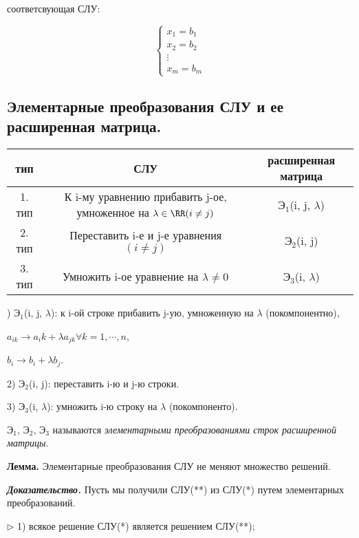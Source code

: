 соответсвующая СЛУ:

\begin{equation*}
    \left\{
		\begin{aligned}
        x_1 = b_1 \\
        x_2 = b_2 \\
        \vdots \\
        x_m = b_m
		\end{aligned}
	\right.
\end{equation*}

\subsection{Элементарные преобразования СЛУ и ее расширенная матрица.}

\bigskip
\begin{table}[!ht]
		\begin{tabular}{c|c|c}
    	тип & СЛУ & расширенная матрица \\
        \hline
        1. тип & К i-му уравнению прибавить j-ое, умноженное на $\lambda \in \RR (i \neq j)$ & $Э_1$(i, j, $\lambda$) \\
        2. тип & Переставить i-е и j-е уравнения $(i \neq j)$  & $Э_2$(i, j) \\
        3. тип & Умножить i-ое уравнение на $\lambda \neq 0$ & $Э_3$(i, $\lambda$) 
		\end{tabular}
\end{table}

) $Э_1$(i, j, $\lambda$): к i-ой строке прибавить j-ую, умноженную на $\lambda$ (покомпонентно),

$a_{ik} \rightarrow a_ik + \lambda a_{jk} \forall k = 1, \cdots, n$,

$b_i \rightarrow b_i + \lambda b_j$.

2) $Э_2$(i, j): переставить i-ю и j-ю строки.

3) $Э_3$(i, $\lambda$): умножить i-ю строку на $\lambda$ (покомпоненто).

\bigskip
$Э_1$, $Э_2$, $Э_3$ называются \textit{элементарными преобразованиями строк расширенной матрицы}.

\bigskip
\textbf{Лемма.} Элементарные преобразования СЛУ не меняют множество решений.

\bigskip
\textbf{\textit{Доказательство.}} Пусть мы получили СЛУ(**) из СЛУ(*) путем элементарных преобразований.

$\rhd$ 1) всякое решение СЛУ(*) является решением СЛУ(**);

